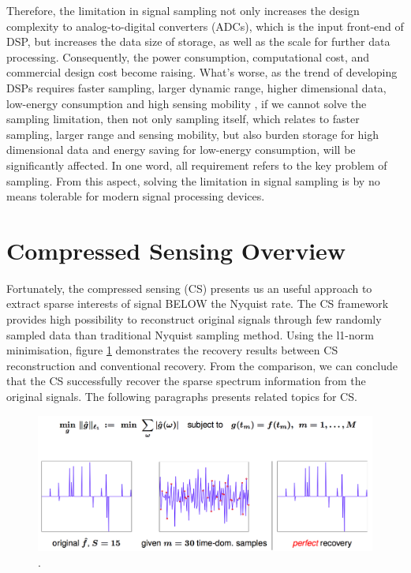 Therefore, the limitation in signal sampling not only increases the design complexity to analog-to-digital converters (ADCs), which is the input front-end of DSP, but increases the data size of storage, as well as the scale for further data processing. Consequently, the power consumption, computational cost, and commercial design cost become raising. What's worse, as the trend of developing DSPs requires faster sampling, larger dynamic range, higher dimensional data, low-energy consumption and high sensing mobility \cite{danckaert1999strategy}, if we cannot solve the sampling limitation, then not only sampling itself, which relates to faster sampling, larger range and sensing mobility, but also burden storage for high dimensional data and energy saving for low-energy consumption, will be significantly affected. In one word, all requirement refers to the key problem of sampling. From this aspect, solving the limitation in signal sampling is by no means tolerable for modern signal processing devices.

\section{Compressed Sensing Overview}
\indent \indent Fortunately, the compressed sensing (CS) presents us an useful approach to extract sparse interests of signal BELOW the Nyquist rate. The CS framework provides high possibility to reconstruct original signals through few randomly sampled data than traditional Nyquist sampling method. Using the l1-norm minimisation, figure \ref{I:intro-cs} demonstrates the recovery results between CS reconstruction and conventional recovery. From the comparison, we can conclude that the CS successfully recover the sparse spectrum information from the original signals. The following paragraphs presents related topics for CS. 

\begin{figure}
\label{I:intro-cs}
\centering
\includegraphics[width=5.0in]{figs/cs-reconst-intro.png}
\DeclareGraphicsExtensions.
\end{figure}

